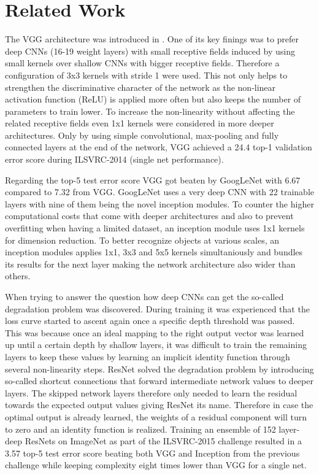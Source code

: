\section{Related Work}

The VGG architecture was introduced in \cite{KarenSimonyan.2014}. One of its key finings was to prefer deep CNNs (16-19 weight layers) with small receptive fields induced by using small kernels over shallow CNNs with bigger receptive fields. Therefore a configuration of 3x3 kernels with stride 1 were used. This not only helps to strengthen the discriminative character of the network as the non-linear activation function (ReLU) is applied more often but also keeps the number of parameters to train lower. To increase the non-linearity without affecting the related receptive fields even 1x1 kernels were considered in more deeper architectures. Only by using simple convolutional, max-pooling and fully connected layers at the end of the network, VGG achieved a 24.4 top-1 validation error score during ILSVRC-2014 (single net performance). \cite{KarenSimonyan.2014}

Regarding the top-5 test error score VGG got beaten by GoogLeNet with 6.67 compared to 7.32 from VGG. GoogLeNet uses a very deep CNN with 22 trainable layers with nine of them being the novel inception modules. To counter the higher computational costs that come with deeper architectures and also to prevent overfitting when having a limited dataset, an inception module uses 1x1 kernels for dimension reduction. To better recognize objects at various scales, an inception modules applies 1x1, 3x3 and 5x5 kernels simultaniously and bundles its results for the next layer making the network architecture also wider than others. \cite{ChristianSzegedy.2014}

When trying to answer the question how deep CNNs can get the so-called degradation problem was discovered. During training it was experienced that the loss curve started to ascent again once a specific depth threshold was passed. This was because once an ideal mapping to the right output vector was learned up until a certain depth by shallow layers, it was difficult to train the remaining layers to keep these values by learning an implicit identity function through several non-linearity steps. ResNet solved the degradation problem by introducing so-called shortcut connections that forward intermediate network values to deeper layers. The skipped network layers therefore only needed to learn the residual towards the expected output values giving ResNet its name. Therefore in case the optimal output is already learned, the weights of a residual component will turn to zero and an identity function is realized. Training an ensemble of 152 layer-deep ResNets on ImageNet as part of the ILSVRC-2015 challenge resulted in a 3.57 top-5 test error score beating both VGG and Inception from the previous challenge while keeping complexity eight times lower  than VGG for a single net. \cite{KaimingHe.2015}

